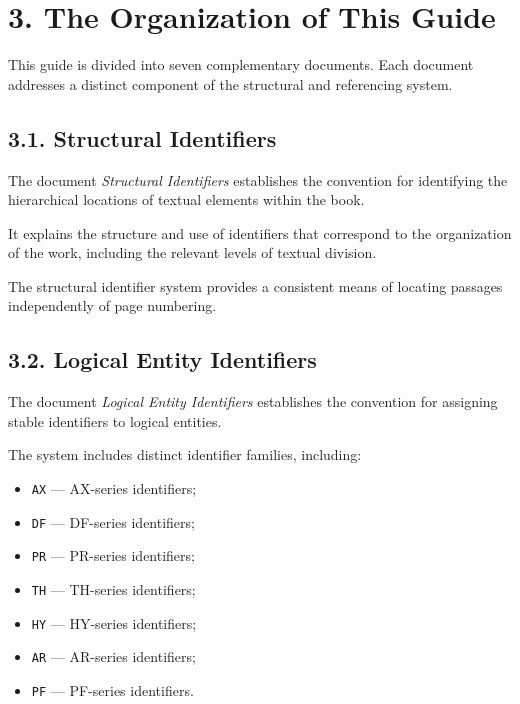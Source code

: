 
\section*{3. The Organization of This Guide}

This guide is divided into seven complementary
documents. Each document addresses a distinct
component of the structural and referencing system.

\subsection*{3.1. Structural Identifiers}

The document \textit{Structural Identifiers}
establishes the convention for identifying the
hierarchical locations of textual elements within
the book.

It explains the structure and use of identifiers
that correspond to the organization of the work,
including the relevant levels of textual division.

The structural identifier system provides a
consistent means of locating passages independently
of page numbering.

\subsection*{3.2. Logical Entity Identifiers}

The document \textit{Logical Entity Identifiers}
establishes the convention for assigning stable
identifiers to logical entities.

The system includes distinct identifier families,
including:

\begin{itemize}
    \item \texttt{AX} --- AX-series identifiers;
    \item \texttt{DF} --- DF-series identifiers;
    \item \texttt{PR} --- PR-series identifiers;
    \item \texttt{TH} --- TH-series identifiers;
    \item \texttt{HY} --- HY-series identifiers;
    \item \texttt{AR} --- AR-series identifiers;
    \item \texttt{PF} --- PF-series identifiers.
\end{itemize}

